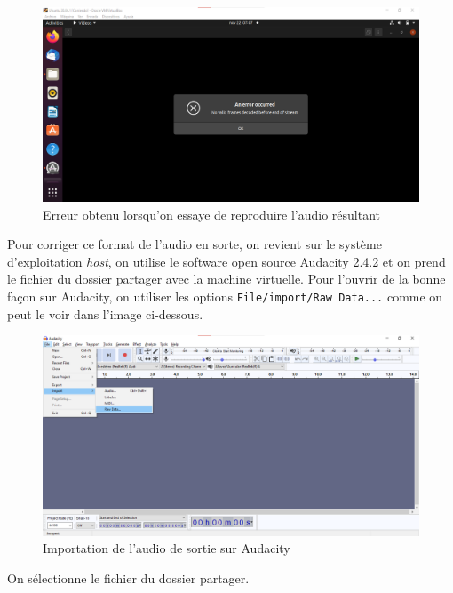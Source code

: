 \documentclass[conference,onecolumn]{IEEEtran}
\begin{document}
 \begin{figure}[H]
 \centering
    \includegraphics[scale=0.4]{VM6.png}
    \caption{Erreur obtenu lorsqu’on essaye de reproduire l’audio résultant} 
\end{figure}

Pour corriger ce format de l’audio en sorte, on revient sur le système d’exploitation \textit{host}, on utilise le software open source \href{https://www.audacityteam.org/}{Audacity 2.4.2} et on prend le fichier du dossier partager avec la machine virtuelle. Pour l’ouvrir de la bonne façon sur Audacity, on utiliser les options \texttt{File/import/Raw Data...} comme on peut le voir dans l’image ci-dessous. 

 \begin{figure}[H]
 \centering
    \includegraphics[scale=0.4]{VM7.png}
    \caption{Importation de l’audio de sortie sur Audacity}
\end{figure}
On sélectionne le fichier du dossier partager.
\end{document}
